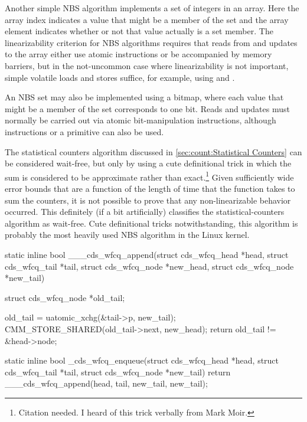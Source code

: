 Another simple NBS algorithm implements a set of integers in an array.
Here the array index indicates a value that might be a member of the set
and the array element indicates whether or not that value actually is
a set member.
The linearizability criterion for NBS algorithms requires that reads from
and updates to the array either use atomic instructions or be accompanied
by memory barriers, but in the not-uncommon case where linearizability
is not important, simple volatile loads and stores suffice, for example,
using  and .

An NBS set may also be implemented using a bitmap, where each value that
might be a member of the set corresponds to one bit.
Reads and updates must normally be carried out via atomic bit-manipulation
instructions, although  instructions or a 
primitive can also be used.

The statistical counters algorithm discussed in
\cref{sec:count:Statistical Counters}
can be considered wait-free, but only by using a cute definitional trick
in which the sum is considered to be approximate rather than exact.\footnote{
	Citation needed.
	I heard of this trick verbally from Mark Moir.}
Given sufficiently wide error bounds that are a function of the length
of time that the  function takes to sum the counters,
it is not possible to prove that any non-linearizable behavior occurred.
This definitely (if a bit artificially) classifies the statistical-counters
algorithm as wait-free.
Cute definitional tricks notwithstanding, this algorithm is probably
the most heavily used NBS algorithm in the Linux kernel.

\begin{listing}[tbp]
\begin{fcvlabel}
\begin{VerbatimL}[commandchars=\\\[\]]
static inline bool
___cds_wfcq_append(struct cds_wfcq_head *head,
                   struct cds_wfcq_tail *tail,
                   struct cds_wfcq_node *new_head,
                   struct cds_wfcq_node *new_tail)
{
	struct cds_wfcq_node *old_tail;

	old_tail = uatomic_xchg(&tail->p, new_tail);	\lnlbl[tail]
	CMM_STORE_SHARED(old_tail->next, new_head);     \lnlbl[pred]
	return old_tail != &head->node;			\lnlbl[ret]
}

static inline bool
_cds_wfcq_enqueue(struct cds_wfcq_head *head,
                  struct cds_wfcq_tail *tail,
                  struct cds_wfcq_node *new_tail)
{
	return ___cds_wfcq_append(head, tail,
	                          new_tail, new_tail);
}
\end{VerbatimL}
\end{fcvlabel}
\caption{NBS Enqueue Algorithm}
\label{lst:count:NBS Enqueue Algorithm}
\end{listing}

